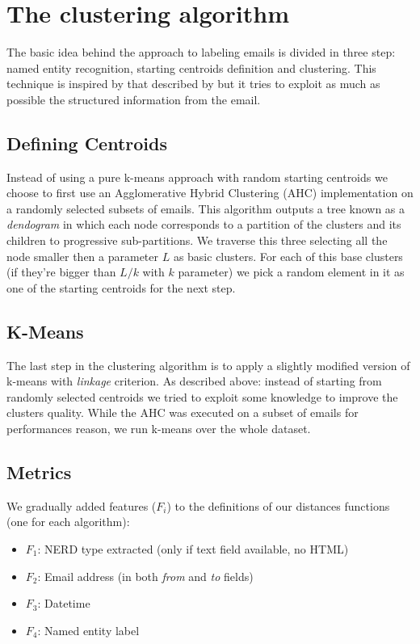 \documentclass[a4paper,12pt]{report}
\begin{document}
\section{The clustering algorithm}
The basic idea behind the approach to labeling emails is divided in three step: named entity recognition, starting centroids definition and clustering. This technique is inspired by that described by \cite{Manco2008} but it tries to exploit as much as possible the structured information from the email.



\subsection{Defining Centroids}
Instead of using a pure k-means approach with random starting centroids we choose to first use an Agglomerative Hybrid Clustering (AHC) implementation on a randomly selected subsets of emails. This algorithm outputs a tree known as a \emph{dendogram} in which each node corresponds to a partition of the clusters and its children to progressive sub-partitions. We traverse this three selecting all the node smaller then a parameter $L$ as basic clusters.
For each of this base clusters (if they're bigger than $L/k$ with $k$ parameter) we pick a random element in it as one of the starting centroids for the next step.

\subsection{K-Means}
The last step in the clustering algorithm is to apply a slightly modified version of k-means with \emph{linkage} criterion. As described above: instead of starting from randomly selected centroids we tried to exploit some knowledge to improve the clusters quality. While the AHC was executed on a subset of emails for performances reason, we run k-means over the whole dataset.

\subsection{Metrics}
We gradually added features ($F_{i}$) to the definitions of our distances functions (one for each algorithm):
\begin{itemize}
\item $F_{1}$: NERD type extracted (only if text field available, no HTML)
\item $F_{2}$: Email address (in both \emph{from} and \emph{to} fields)
\item $F_{3}$: Datetime 
\item $F_{4}$: Named entity label
\end{itemize}
\end{document}
